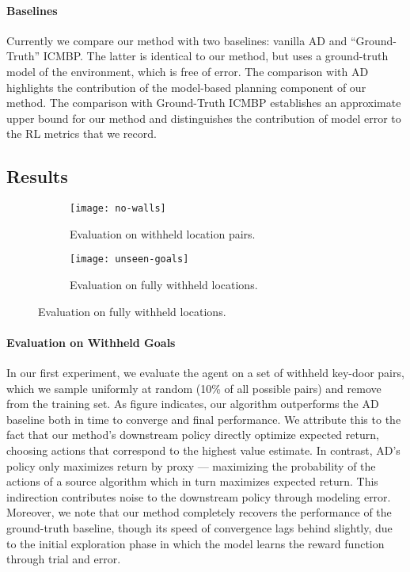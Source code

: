 \paragraph{Baselines}
Currently we compare our method with two baselines: vanilla AD and
``Ground-Truth'' ICMBP. The latter is identical to our method, but uses a
ground-truth model of the environment, which is free of error. The comparison
with AD highlights the contribution of the model-based planning component of our
method. The comparison with Ground-Truth ICMBP establishes an approximate upper
bound for our method and distinguishes the contribution of model error to the
RL metrics that we record.

\subsection{Results}
\begin{figure}
    \centering
    \begin{subfigure}{0.35\textwidth}
        \texttt{[image: no-walls]}
        \caption{Evaluation on withheld location pairs.}
    \end{subfigure}
    \hfill
    \begin{subfigure}{0.58\textwidth}
        \texttt{[image: unseen-goals]}
        \caption{Evaluation on fully withheld locations.}
    \end{subfigure}
\end{figure}



\paragraph{Evaluation on Withheld Goals}
In our first experiment, we evaluate the agent on a set of withheld key-door
pairs, which we sample uniformly at random (10\% of all possible pairs) and
remove from the training set. As figure  indicates, our
algorithm outperforms the AD baseline both in time to converge and final
performance. We attribute this to the fact that our method's downstream policy
directly optimize expected return, choosing actions that correspond to the
highest value estimate. In contrast, AD's policy only maximizes return by proxy
--- maximizing the probability of the actions of a source algorithm which in
turn maximizes expected return. This indirection contributes noise to the
downstream policy through modeling error. Moreover, we note that our method
completely recovers the performance of the ground-truth baseline, though its
speed of convergence lags behind slightly, due to the initial exploration phase
in which the model learns the reward function through trial and error.

